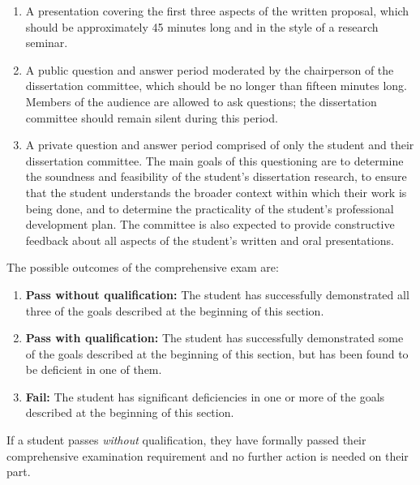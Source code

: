 \begin{enumerate}
\item  A presentation covering the first three aspects of the written
  proposal, which should be approximately 45 minutes long and in the
  style of a research seminar.

\item  A public question and answer period moderated by the
  chairperson of the dissertation committee, which should be no longer than
  fifteen minutes long.  Members of the audience are allowed to ask
  questions; the dissertation committee should remain silent during this
  period.

\item  A private question and answer period comprised of only the
  student and their dissertation committee.  The main goals of this
  questioning are to determine the soundness and feasibility of the
  student's dissertation research, to ensure that the student
  understands the broader context within which their work is being
  done, and to determine the practicality of the student's
  professional development plan.  The committee is also expected to
  provide constructive feedback about all aspects of the student's
  written and oral presentations.

\end{enumerate}

\vspace{2mm}

\noindent
The possible outcomes of the comprehensive exam are:

\begin{enumerate}
\item  \textbf{Pass without qualification:} The student has
  successfully demonstrated all three of the goals described at the
  beginning of this section.

\item  \textbf{Pass with qualification:} The student has successfully
  demonstrated some of the goals described at the beginning of this
  section, but has been found to be deficient in one of them.  

\item  \textbf{Fail:} The student has significant deficiencies in one
  or more of the goals described at the beginning of this section.

\end{enumerate}

If a student passes \textit{without} qualification, they have formally
passed their comprehensive examination requirement and no further
action is needed on their part.

